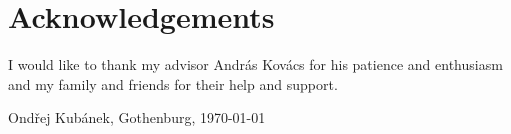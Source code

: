 \thispagestyle{plain}			%
\section*{Acknowledgements}

I would like to thank my advisor András Kovács for his patience and enthusiasm and my family and friends for their help and support.

\vspace{1.5cm}
\hfill
Ond\v{r}ej Kubánek, Gothenburg, \today

\newpage				%
\thispagestyle{empty}
\mbox{}

